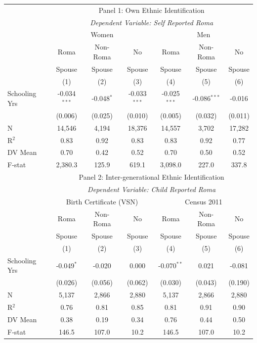 \begin{tabular}{lccc@{\hspace{2em}}ccc}
\toprule
& \multicolumn{6}{c}{Panel 1: Own Ethnic Identification} \\
& \multicolumn{6}{c}{\textit{Dependent Variable: Self Reported Roma}} \\
& \multicolumn{3}{c}{Women} & \multicolumn{3}{c}{Men} \\
& Roma   &  Non-Roma & No      & Roma   &  Non-Roma & No  \\
& Spouse & Spouse & Spouse   & Spouse & Spouse & Spouse \\
& (1) & (2) & (3) & (4) & (5) & (6) \\
\midrule
Schooling Yrs & -0.034$^{***}$ & -0.048$^{*}$ & -0.033$^{***}$ & -0.025$^{***}$ & -0.086$^{***}$ & -0.016 \\
& (0.006) & (0.025) & (0.010) & (0.005) & (0.032) & (0.011) \\
\midrule
N & 14,546 & 4,194 & 18,376 & 14,557 & 3,702 & 17,282 \\
R$^2$ & 0.83 & 0.92 & 0.83 & 0.83 & 0.92 & 0.77 \\
DV Mean & 0.70 & 0.42 & 0.52 & 0.70 & 0.50 & 0.52 \\
F-stat & 2,380.3 & 125.9 & 619.1 & 3,098.0 & 227.0 & 337.8 \\
\addlinespace \midrule
& \multicolumn{6}{c}{Panel 2: Inter-generational Ethnic Identification} \\
& \multicolumn{6}{c}{\textit{Dependent Variable: Child Reported Roma}} \\
& \multicolumn{3}{c}{Birth Certificate (VSN)} & \multicolumn{3}{c}{Census 2011} \\
& Roma   &  Non-Roma & No      & Roma   &  Non-Roma & No  \\
& Spouse & Spouse & Spouse   & Spouse & Spouse & Spouse \\
& (1) & (2) & (3) & (4) & (5) & (6) \\
\midrule
Schooling Yrs & -0.049$^{*}$ & -0.020 & 0.000 & -0.070$^{**}$ & 0.021 & -0.081 \\
& (0.026) & (0.056) & (0.062) & (0.030) & (0.043) & (0.190) \\
\midrule
N & 5,137 & 2,866 & 2,880 & 5,137 & 2,866 & 2,880 \\
R$^2$ & 0.76 & 0.81 & 0.85 & 0.81 & 0.91 & 0.90 \\
DV Mean & 0.38 & 0.19 & 0.34 & 0.76 & 0.44 & 0.50 \\
F-stat & 146.5 & 107.0 & 10.2 & 146.5 & 107.0 & 10.2 \\
\bottomrule
\end{tabular}
